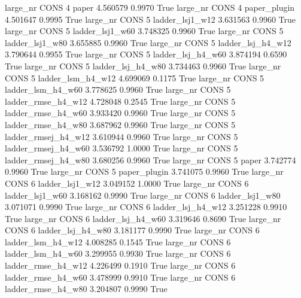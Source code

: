   large_nr     CONS                 4               paper    4.560579      0.9970    True
  large_nr     CONS                 4        paper_plugin    4.501647      0.9995    True
  large_nr     CONS                 5     ladder_lsj1_w12    3.631563      0.9960    True
  large_nr     CONS                 5     ladder_lsj1_w60    3.748325      0.9960    True
  large_nr     CONS                 5     ladder_lsj1_w80    3.655885      0.9960    True
  large_nr     CONS                 5   ladder_lsj_h4_w12    3.790644      0.9955    True
  large_nr     CONS                 5   ladder_lsj_h4_w60    3.874194      0.6590    True
  large_nr     CONS                 5   ladder_lsj_h4_w80    3.734463      0.9960    True
  large_nr     CONS                 5   ladder_lsm_h4_w12    4.699069      0.1175    True
  large_nr     CONS                 5   ladder_lsm_h4_w60    3.778625      0.9960    True
  large_nr     CONS                 5  ladder_rmse_h4_w12    4.728048      0.2545    True
  large_nr     CONS                 5  ladder_rmse_h4_w60    3.933420      0.9960    True
  large_nr     CONS                 5  ladder_rmse_h4_w80    3.687962      0.9960    True
  large_nr     CONS                 5 ladder_rmsej_h4_w12    3.610944      0.9960    True
  large_nr     CONS                 5 ladder_rmsej_h4_w60    3.536792      1.0000    True
  large_nr     CONS                 5 ladder_rmsej_h4_w80    3.680256      0.9960    True
  large_nr     CONS                 5               paper    3.742774      0.9960    True
  large_nr     CONS                 5        paper_plugin    3.741075      0.9960    True
  large_nr     CONS                 6     ladder_lsj1_w12    3.049152      1.0000    True
  large_nr     CONS                 6     ladder_lsj1_w60    3.168162      0.9990    True
  large_nr     CONS                 6     ladder_lsj1_w80    3.071071      0.9990    True
  large_nr     CONS                 6   ladder_lsj_h4_w12    3.251228      0.9910    True
  large_nr     CONS                 6   ladder_lsj_h4_w60    3.319646      0.8690    True
  large_nr     CONS                 6   ladder_lsj_h4_w80    3.181177      0.9990    True
  large_nr     CONS                 6   ladder_lsm_h4_w12    4.008285      0.1545    True
  large_nr     CONS                 6   ladder_lsm_h4_w60    3.299955      0.9930    True
  large_nr     CONS                 6  ladder_rmse_h4_w12    4.226499      0.1910    True
  large_nr     CONS                 6  ladder_rmse_h4_w60    3.478999      0.9910    True
  large_nr     CONS                 6  ladder_rmse_h4_w80    3.204807      0.9990    True
